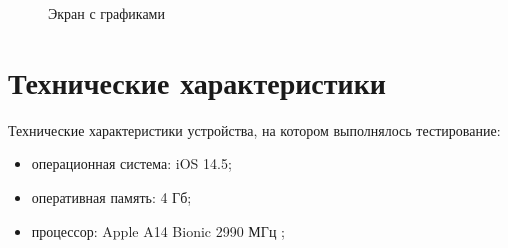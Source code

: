 \begin{figure}[h!]
	\caption{Экран с графиками}
	\label{fig:график}
\end{figure}

\section{Технические характеристики}



Технические характеристики устройства, на котором выполнялось тестирование:

\begin{itemize}
	\item операционная система: iOS 14.5;
	\item оперативная память: 4 Гб;
	\item процессор: Apple A14 Bionic 2990 МГц \cite{ipad};
\end{itemize}

